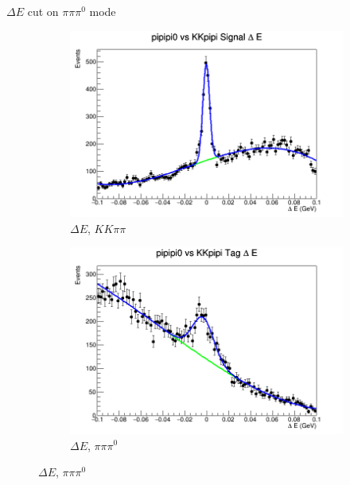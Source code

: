 \documentclass{beamer}
\begin{document}
\begin{frame}{$\Delta E$ cut on $\pi\pi\pi^0$ mode}
  \begin{figure}
    \centering
    \begin{subfigure}{0.5\textwidth}
      \centering
      \includegraphics[width=\textwidth]{pipipi0SignalDeltaE.png}
      \caption{$\Delta E$, $KK\pi\pi$}
    \end{subfigure}%
    \begin{subfigure}{0.5\textwidth}
      \centering
      \includegraphics[width=\textwidth]{pipipi0TagDeltaE.png}
      \caption{$\Delta E$, $\pi\pi\pi^0$}
    \end{subfigure}
  \end{figure}
\end{frame}
\end{document}
